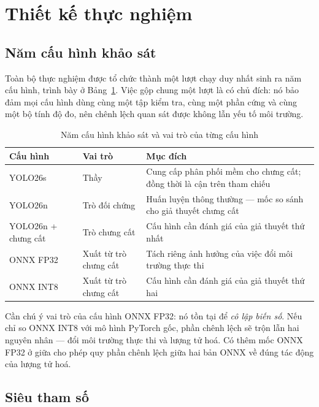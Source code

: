 \section{Thiết kế thực nghiệm}

\subsection{Năm cấu hình khảo sát}

Toàn bộ thực nghiệm được tổ chức thành một lượt chạy duy nhất sinh ra năm cấu hình, trình bày ở
Bảng~\ref{tab:cauhinh}. Việc gộp chung một lượt là có chủ đích: nó bảo đảm mọi cấu hình dùng cùng
một tập kiểm tra, cùng một phần cứng và cùng một bộ tính độ đo, nên chênh lệch quan sát được không
lẫn yếu tố môi trường.

\begin{table}[H]
\centering
\caption{Năm cấu hình khảo sát và vai trò của từng cấu hình}
\label{tab:cauhinh}
\small
\begin{tabular}{p{3.6cm} p{3.1cm} p{6.6cm}}
\toprule
\textbf{Cấu hình} & \textbf{Vai trò} & \textbf{Mục đích} \\
\midrule
YOLO26s            & Thầy            & Cung cấp phân phối mềm cho chưng cất; đồng thời là cận trên tham chiếu \\
YOLO26n            & Trò đối chứng   & Huấn luyện thông thường --- mốc so sánh cho giả thuyết chưng cất \\
YOLO26n + chưng cất& Trò chưng cất   & Cấu hình cần đánh giá của giả thuyết thứ nhất \\
ONNX FP32          & Xuất từ trò chưng cất & Tách riêng ảnh hưởng của việc đổi môi trường thực thi \\
ONNX INT8          & Xuất từ trò chưng cất & Cấu hình cần đánh giá của giả thuyết thứ hai \\
\bottomrule
\end{tabular}
\end{table}

Cần chú ý vai trò của cấu hình ONNX FP32: nó tồn tại để \emph{cô lập biến số}. Nếu chỉ so ONNX INT8
với mô hình PyTorch gốc, phần chênh lệch sẽ trộn lẫn hai nguyên nhân --- đổi môi trường thực thi và
lượng tử hoá. Có thêm mốc ONNX FP32 ở giữa cho phép quy phần chênh lệch giữa hai bản ONNX về đúng
tác động của lượng tử hoá.

\subsection{Siêu tham số}

